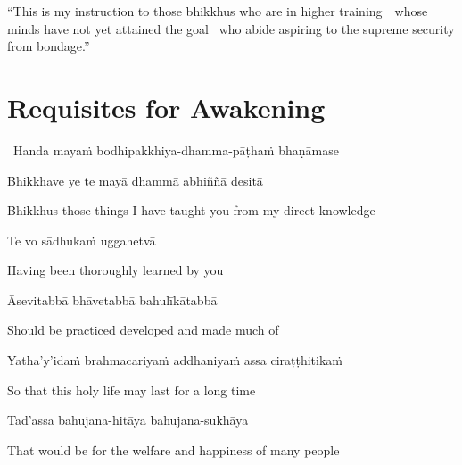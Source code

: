 \suttaRef{[MN 39]}

\begin{english-only-justify}
  ``This is my instruction to those bhikkhus who are in higher \mbox{training}~\breathmark\ whose minds have not yet attained the goal \breathmark\ who abide aspiring to the supreme security from bondage.''
\end{english-only-justify}

\suttaRef{[MN 107]}


\section{Requisites for Awakening}
\label{requisites-for-awakening}

\begin{leader}
  \anglebracketleft\ \hspace{-0.5mm}Handa mayaṁ bodhipakkhiya-dhamma-pāṭhaṁ bhaṇāmase \hspace{-0.5mm}\anglebracketright\
\end{leader}

Bhikkhave ye te mayā dhammā abhiññā desitā

\begin{english}
  Bhikkhus those things I have taught you from my direct knowledge
\end{english}

Te vo sādhukaṁ uggahetvā

\begin{english}
  Having been thoroughly learned by you
\end{english}

Āsevitabbā bhāvetabbā bahulīkātabbā

\begin{english}
  Should be practiced developed and made much of
\end{english}

Yatha'y'idaṁ brahmacariyaṁ addhaniyaṁ assa ciraṭṭhitikaṁ

\begin{english}
  So that this holy life may last for a long time
\end{english}

Tad'assa bahujana-hitāya bahujana-sukhāya

\begin{english}
  That would be for the welfare and happiness of many people
\end{english}

